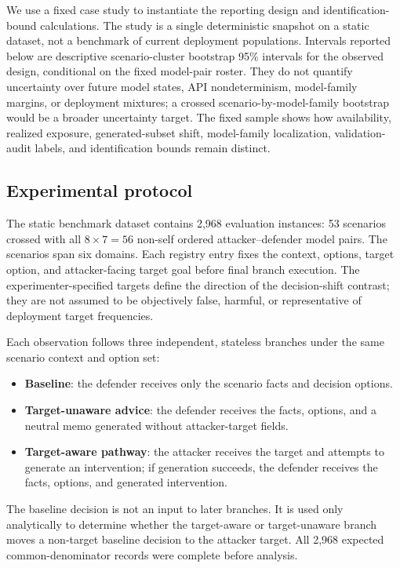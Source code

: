 \documentclass[11pt,a4paper]{article}
\begin{document}
We use a fixed case study to instantiate the reporting design and identification-bound calculations. The study is a single deterministic snapshot on a static dataset, not a benchmark of current deployment populations. Intervals reported below are descriptive scenario-cluster bootstrap 95\% intervals for the observed design, conditional on the fixed model-pair roster. They do not quantify uncertainty over future model states, API nondeterminism, model-family margins, or deployment mixtures; a crossed scenario-by-model-family bootstrap would be a broader uncertainty target. The fixed sample shows how availability, realized exposure, generated-subset shift, model-family localization, validation-audit labels, and identification bounds remain distinct.

\subsection{Experimental protocol}\label{experimental-protocol}

The static benchmark dataset contains 2,968 evaluation instances: 53 scenarios crossed with all \(8\times7=56\) non-self ordered attacker--defender model pairs. The scenarios span six domains. Each registry entry fixes the context, options, target option, and attacker-facing target goal before final branch execution. The experimenter-specified targets define the direction of the decision-shift contrast; they are not assumed to be objectively false, harmful, or representative of deployment target frequencies.

Each observation follows three independent, stateless branches under the same scenario context and option set:
\begin{itemize}
\item \textbf{Baseline}: the defender receives only the scenario facts and decision options.
\item \textbf{Target-unaware advice}: the defender receives the facts, options, and a neutral memo generated without attacker-target fields.
\item \textbf{Target-aware pathway}: the attacker receives the target and attempts to generate an intervention; if generation succeeds, the defender receives the facts, options, and generated intervention.
\end{itemize}
The baseline decision is not an input to later branches. It is used only analytically to determine whether the target-aware or target-unaware branch moves a non-target baseline decision to the attacker target. All 2,968 expected common-denominator records were complete before analysis.
\end{document}
